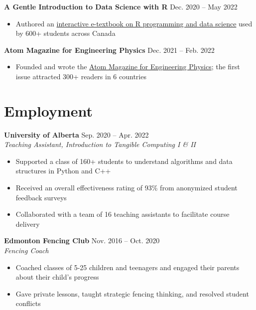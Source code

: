 \documentclass{article}
\begin{document}
\textbf{A Gentle Introduction to Data Science with R} \hfill Dec. 2020 -- May 2022
\begin{itemize}
    \item Authored an \href{https://youreka-textbook.netlify.app/}{interactive e-textbook on R programming and data science} used by 600+ students across Canada
\end{itemize} \vspace{1em}

\textbf{Atom Magazine for Engineering Physics} \hfill Dec. 2021 -- Feb. 2022
\begin{itemize}
    \item Founded and wrote the \href{https://atom-winter-2022.netlify.app/}{Atom Magazine for Engineering Physics}; the first issue attracted 300+ readers in 6 countries
\end{itemize}


\section*{\textcolor{my_colour}{Employment}}
\vspace{-.25em} \hrulefill \vspace{.25em}

\textbf{University of Alberta} \hfill Sep. 2020 -- Apr. 2022 \\
\textit{Teaching Assistant, Introduction to Tangible Computing I \& II}
\begin{itemize}
    \item Supported a class of 160+ students to understand algorithms and data structures in Python and C++
    \item Received an overall effectiveness rating of 93\% from anonymized student feedback surveys
    \item Collaborated with a team of 16 teaching assistants to facilitate course delivery
\end{itemize} \vspace{1em}

\textbf{Edmonton Fencing Club} \hfill Nov. 2016 -- Oct. 2020 \\
\textit{Fencing Coach}
\begin{itemize}
    \item Coached classes of 5-25 children and teenagers and engaged their parents about their child's progress
    \item Gave private lessons, taught strategic fencing thinking, and resolved student conflicts
\end{itemize}
\end{document}
